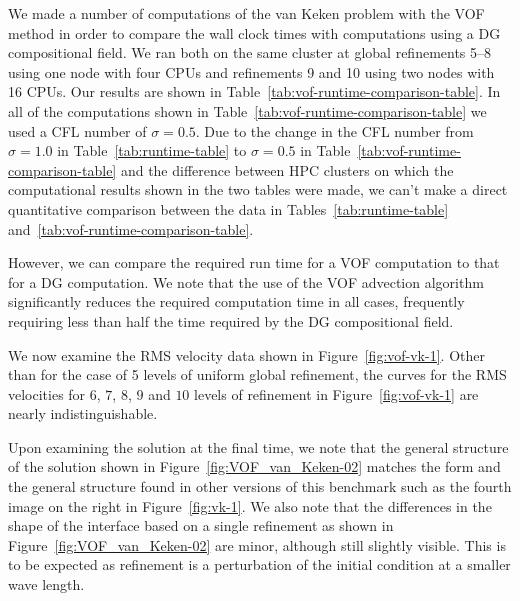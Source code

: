 
\noindent

We made a number of computations of the van Keken problem with the VOF method in order to 
compare the wall clock times with computations using a DG compositional field.
We ran both on the same cluster at global refinements 5--8 using one node with four CPUs and 
refinements 9 and 10 using two nodes with 16 CPUs.
Our results are shown in Table~\ref{tab:vof-runtime-comparison-table}.
In all of the computations shown in Table~\ref{tab:vof-runtime-comparison-table} we used a CFL 
number of $\sigma=0.5$.
Due to the change in the CFL number from $\sigma = 1.0$ in Table~\ref{tab:runtime-table} to 
$\sigma = 0.5$ in Table~\ref{tab:vof-runtime-comparison-table} and the difference between HPC 
clusters on which the computational results shown in the two tables were made, we can't make a
direct quantitative comparison between the data in Tables~\ref{tab:runtime-table} 
and~\ref{tab:vof-runtime-comparison-table}.

However, we can compare the required run time for a VOF computation to that for a DG computation.
We note that the use of the VOF advection algorithm significantly reduces the
required computation time in all cases, frequently requiring less than half the
time required by the DG compositional field.

We now examine the RMS velocity data shown in Figure~\ref{fig:vof-vk-1}.
Other than for the case of 5 levels of uniform global refinement, the curves for the RMS 
velocities for $6$, $7$, $8$, $9$ and $10$ levels of refinement in Figure~\ref{fig:vof-vk-1} 
are nearly indistinguishable.

Upon examining the solution at the final time, we note that the general structure of the 
solution shown in Figure~\ref{fig:VOF_van_Keken-02} matches the form and the general structure 
found in other versions of this benchmark such as the fourth image on the right in 
Figure~\ref{fig:vk-1}.
We also note that the differences in the shape of the interface based on a single refinement 
as shown in Figure~\ref{fig:VOF_van_Keken-02} are minor, although still slightly visible.
This is to be expected as refinement is a perturbation of the initial condition at a smaller 
wave length.

